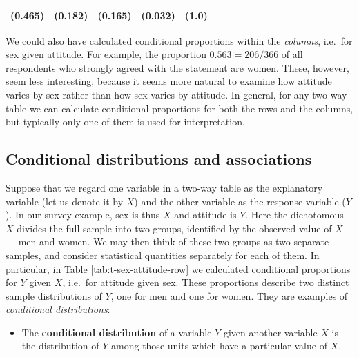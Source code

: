 \documentclass[11pt,a4paper,openany]{book}
\providecommand{\tightlist}{%
  \setlength{\itemsep}{0pt}\setlength{\parskip}{0pt}}
\begin{document}
\begin{longtable}[]{@{}lcccccc@{}}
\begin{minipage}[t]{0.09\columnwidth}
(0.465)\strut
\end{minipage} & \begin{minipage}[t]{0.15\columnwidth}\centering\strut
(0.182)\strut
\end{minipage} & \begin{minipage}[t]{0.10\columnwidth}\centering\strut
(0.165)\strut
\end{minipage} & \begin{minipage}[t]{0.10\columnwidth}\centering\strut
(0.032)\strut
\end{minipage} & \begin{minipage}[t]{0.07\columnwidth}\centering\strut
(1.0)\strut
\end{minipage}\tabularnewline
\bottomrule
\end{longtable}

We could also have calculated conditional proportions within the
\emph{columns}, i.e.~for sex given attitude. For example, the proportion
\(0.563=206/366\) of all respondents who strongly agreed with the
statement are women. These, however, seem less interesting, because it
seems more natural to examine how attitude varies by sex rather than how
sex varies by attitude. In general, for any two-way table we can
calculate conditional proportions for both the rows and the columns, but
typically only one of them is used for interpretation.

\subsection{Conditional distributions and
associations}\label{ss-descr1-2cat-assoc}

Suppose that we regard one variable in a two-way table as the
explanatory variable (let us denote it by \(X\)) and the other variable
as the response variable (\(Y\)). In our survey example, sex is thus
\(X\) and attitude is \(Y\). Here the dichotomous \(X\) divides the full
sample into two groups, identified by the observed value of \(X\) ---
men and women. We may then think of these two groups as two separate
samples, and consider statistical quantities separately for each of
them. In particular, in Table \ref{tab:t-sex-attitude-row} we calculated
conditional proportions for \(Y\) given \(X\), i.e.~for attitude given
sex. These proportions describe two distinct sample distributions of
\(Y\), one for men and one for women. They are examples of
\emph{conditional distributions}:

\begin{itemize}
\tightlist
\item
  The \textbf{conditional distribution} of a variable \(Y\) given
  another variable \(X\) is the distribution of \(Y\) among those units
  which have a particular value of \(X\).
\end{itemize}
\end{document}
